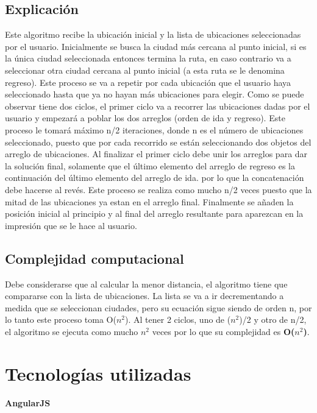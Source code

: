 \documentclass[10pt]{report}
\begin{document}
\subsection*{Explicación}

Este algoritmo recibe la ubicación inicial y la lista de ubicaciones seleccionadas por el usuario. Inicialmente se busca la ciudad m\'{a}s cercana al punto inicial, si es la única ciudad seleccionada entonces termina la ruta, en caso contrario va a seleccionar otra ciudad cercana al punto inicial (a esta ruta se le denomina regreso). Este proceso se va a repetir por cada ubicación que el usuario haya seleccionado hasta que ya no hayan más ubicaciones para elegir. Como se puede observar tiene dos ciclos, el primer ciclo va a recorrer las ubicaciones dadas por el usuario y empezará a poblar los dos arreglos (orden de ida y regreso). Este proceso le tomará máximo n/2 iteraciones, donde n es el número de ubicaciones seleccionado, puesto que por cada recorrido se están seleccionando dos objetos del arreglo de ubicaciones. Al finalizar el primer ciclo debe unir los arreglos para dar la solución final, solamente que el último elemento del arreglo de regreso es la continuación del último elemento del arreglo de ida. por lo que la concatenación debe hacerse al revés. Este proceso se realiza como mucho n/2 veces puesto que la mitad de las ubicaciones ya estan en el arreglo final. Finalmente se añaden la posición inicial al principio y al final del arreglo resultante para aparezcan en la impresión que se le hace al usuario.

\subsection*{Complejidad computacional}

Debe considerarse que al calcular la menor distancia, el algoritmo tiene que compararse con la lista de ubicaciones. La lista se va a ir decrementando a medida que se seleccionan ciudades, pero su ecuación sigue siendo de orden n, por lo tanto este proceso toma O($n^2$). Al tener 2 ciclos, uno de ($n^2$)/2 y otro de n/2, el algoritmo se ejecuta como mucho $n^2$ veces por lo que su complejidad es \textbf{O($n^2$)}.

\section*{Tecnologías utilizadas}

{\large \textbf{AngularJS}}
\end{document}
